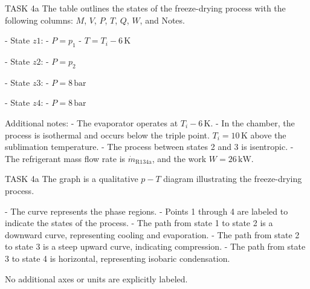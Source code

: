 TASK 4a  
The table outlines the states of the freeze-drying process with the following columns: \( M \), \( V \), \( P \), \( T \), \( Q \), \( W \), and Notes.  

- State \( z1 \):  
  - \( P = p_1 \)  
  - \( T = T_i - 6 \, \text{K} \)  

- State \( z2 \):  
  - \( P = p_2 \)  

- State \( z3 \):  
  - \( P = 8 \, \text{bar} \)  

- State \( z4 \):  
  - \( P = 8 \, \text{bar} \)  

Additional notes:  
- The evaporator operates at \( T_i - 6 \, \text{K} \).  
- In the chamber, the process is isothermal and occurs below the triple point. \( T_i = 10 \, \text{K} \) above the sublimation temperature.  
- The process between states 2 and 3 is isentropic.  
- The refrigerant mass flow rate is \( \dot{m}_{\text{R134a}} \), and the work \( W = 26 \, \text{kW} \).  

TASK 4a  
The graph is a qualitative \( p-T \) diagram illustrating the freeze-drying process.  

- The curve represents the phase regions.  
- Points 1 through 4 are labeled to indicate the states of the process.  
- The path from state 1 to state 2 is a downward curve, representing cooling and evaporation.  
- The path from state 2 to state 3 is a steep upward curve, indicating compression.  
- The path from state 3 to state 4 is horizontal, representing isobaric condensation.  

No additional axes or units are explicitly labeled.